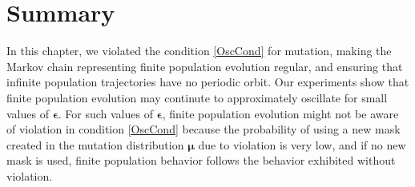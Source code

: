 \clearpage
\section{Summary}
In this chapter, we violated the condition \ref{OscCond} for mutation, making 
the Markov chain representing finite population evolution regular, and ensuring that infinite population trajectories 
have no periodic orbit. Our experiments show that finite population evolution 
may continute to approximately oscillate for small values of $\bm{\epsilon}$. 
For such values of $\bm{\epsilon}$, finite population evolution might not be 
aware of violation in condition \ref{OscCond} because the probability of using 
a new mask created in the mutation distribution $\bm{\mu}$ due to violation is very low, and 
if no new mask is used, finite population behavior follows the behavior exhibited without violation. 




 
